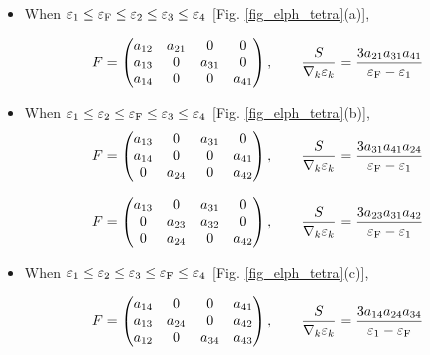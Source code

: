 \documentclass[12pt]{article}
\begin{document}
\begin{itemize}

\item When $\varepsilon_1 \leq \varepsilon_{\rm F} \leq \varepsilon_2 \leq \varepsilon_3 \leq\varepsilon_4$
  [Fig. \ref{fig_elph_tetra}(a)], 

  \begin{align}
    F &= 
    \begin{pmatrix}
      a_{1 2} & a_{2 1} &       0 & 0 \\
      a_{1 3} &       0 & a_{3 1} & 0 \\
      a_{1 4} &       0 &       0 & a_{4 1}
    \end{pmatrix}, 
    \qquad
    \frac{S}{\nabla_k \varepsilon_k} = \frac{3 a_{2 1} a_{3 1} a_{4 1}}{\varepsilon_{\rm F} - \varepsilon_1}
  \end{align}
  
\item When $\varepsilon_1 \leq \varepsilon_2 \leq \varepsilon_{\rm F} \leq \varepsilon_3 \leq\varepsilon_4$
  [Fig. \ref{fig_elph_tetra}(b)], 
  \begin{align}
    F &= 
    \begin{pmatrix}
      a_{1 3} &       0 & a_{3 1} & 0 \\
      a_{1 4} &       0 &       0 & a_{4 1} \\
            0 & a_{2 4} &       0 & a_{4 2}
    \end{pmatrix}, 
    \qquad
    \frac{S}{\nabla_k \varepsilon_k} = \frac{3 a_{3 1} a_{4 1} a_{2 4}}{\varepsilon_{\rm F} - \varepsilon_1}
  \end{align}
  
  \begin{align}
    F &= 
    \begin{pmatrix}
      a_{1 3} &       0 & a_{3 1} & 0 \\
            0 & a_{2 3} & a_{3 2} & 0 \\
            0 & a_{2 4} &       0 & a_{4 2}
    \end{pmatrix}, 
    \qquad
    \frac{S}{\nabla_k \varepsilon_k} = \frac{3 a_{2 3} a_{3 1} a_{4 2}}{\varepsilon_{\rm F} - \varepsilon_1}
  \end{align}

\item When $\varepsilon_1 \leq \varepsilon_2 \leq \varepsilon_3 \leq \varepsilon_{\rm F} \leq \varepsilon_4$
  [Fig. \ref{fig_elph_tetra}(c)], 

  \begin{align}
    F &= 
    \begin{pmatrix}
      a_{1 4} &       0 &       0 & a_{4 1} \\
      a_{1 3} & a_{2 4} &       0 & a_{4 2} \\
      a_{1 2} &       0 & a_{3 4} & a_{4 3}
    \end{pmatrix}, 
    \qquad
    \frac{S}{\nabla_k \varepsilon_k} = \frac{3 a_{1 4} a_{2 4} a_{3 4}}{\varepsilon_1 - \varepsilon_{\rm F}}
  \end{align}

\end{itemize}
\end{document}
